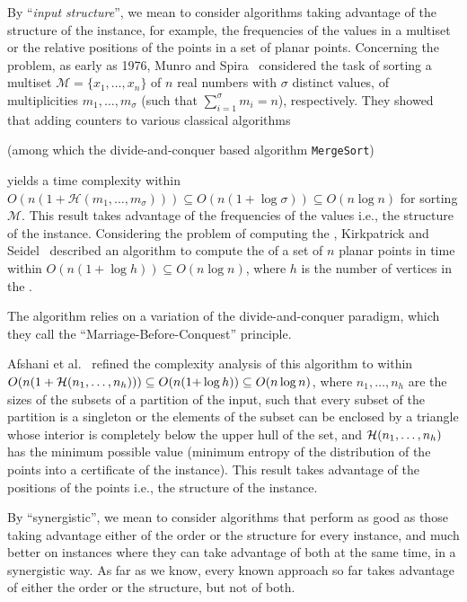 By ``\emph{input structure}'', we mean to consider algorithms taking
advantage of the structure of the instance, for example, the
frequencies of the values in a multiset or the relative positions of
the points in a set of planar points.
Concerning the {} problem, as early as 1976, Munro and
Spira~\cite{1976-JComp-SortingAndSearchingInMultisets-MunroSpira}
considered the task of sorting a multiset
$\mathcal{M}=\{x_1, \dots, x_n\}$ of $n$ real numbers with $\sigma$
distinct values, of multiplicities $m_1, \dots, m_\sigma$ (such that
$\sum_{i=1}^\sigma {m_i}=n$), respectively. They showed that adding
counters to various classical algorithms
\begin{INUTILE}
  (among which the divide-and-conquer based algorithm
  {\tt{MergeSort}})
\end{INUTILE}
yields a time complexity within
$O(n(1+\mathcal{H}(m_1, \dots, m_\sigma))) \subseteq
O(n(1{+}\log{\sigma})) \subseteq O(n\log{n})$ for sorting
$\mathcal{M}$. This result takes advantage of the frequencies of the
values i.e., the structure of the instance.
Considering the problem of computing the {},
Kirkpatrick and
Seidel~\cite{1986-JCom-TheUltimatePlanarConvexHullAlgorithm-KirkpatrickSeidel}
described an algorithm to compute the {} of a set of
$n$ planar points in time within $O(n(1+\log h))\subseteq O(n\log n)$,
where $h$ is the number of vertices in the {}.
\begin{INUTILE}
  The algorithm relies on a variation of the divide-and-conquer
  paradigm, which they call the ``Marriage-Before-Conquest''
  principle.
\end{INUTILE}
Afshani et
al.~\cite{2009-FOCS-InstanceOptimalGeometricAlgorithms-AfshaniBarbayChan}
refined the complexity analysis of this algorithm to within
$O(n(1+{\cal H}(n_1,\ldots,n_h)))\subseteq O(n(1{+}\log h)) \subseteq
O(n\log{n})$, where $n_1, \dots, n_h$ are the sizes of the subsets of
a partition of the input, such that every subset of the partition is a
singleton or the elements of the subset can be enclosed by a triangle
whose interior is completely below the upper hull of the set, and
${\cal H}(n_1,\ldots,n_h)$ has the minimum possible value (minimum
entropy of the distribution of the points into a certificate of the
instance). This result takes advantage of the positions of the points
i.e., the structure of the instance.

By ``synergistic'', we mean to consider algorithms that perform as
good as those taking advantage either of the order or the structure
for every instance, and much better on instances where they can take
advantage of both at the same time, in a synergistic way. As far as we
know, every known approach so far takes advantage of either the order or the
structure, but not of both.

